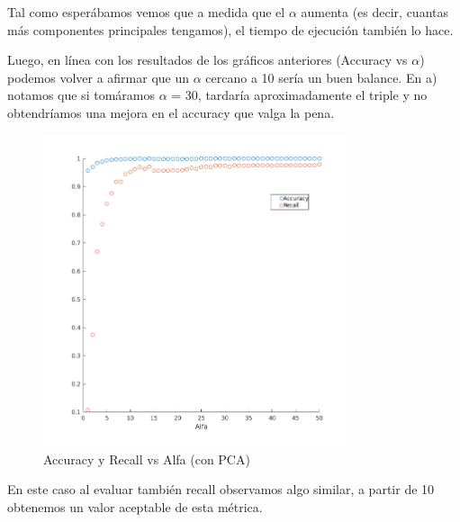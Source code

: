 Tal como esperábamos vemos que a medida que el $\alpha$ aumenta (es decir, cuantas más componentes principales tengamos), el tiempo de ejecución también lo hace.

Luego, en línea con los resultados de los gráficos anteriores (Accuracy vs $\alpha$) podemos volver a afirmar que un $\alpha$ cercano a 10 sería un buen balance. En a) notamos que si tomáramos $\alpha$ = 30, tardaría aproximadamente el triple y no obtendríamos una mejora en el accuracy que valga la pena.
\begin{figure}[H]
	\centering
	\includegraphics[width=0.8\textwidth]{img/Acc_recall_alfa_pca.png}
	\caption{Accuracy y Recall vs Alfa (con PCA)}
	\label{fig: Accuracy y Recall vs Alfa (con PCA)}
\end{figure}

En este caso al evaluar también recall observamos algo similar, a partir de 10 obtenemos un valor aceptable de esta métrica.

